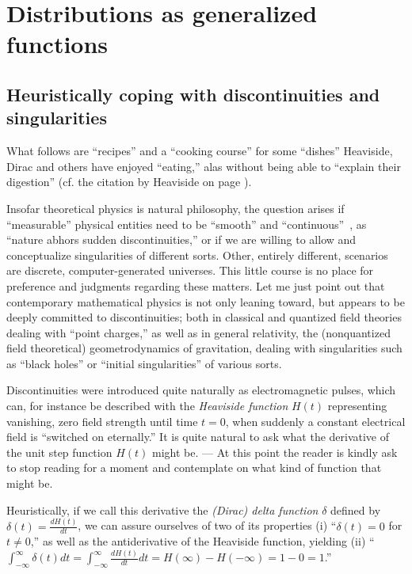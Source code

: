 \chapter{Distributions as generalized functions}
\label{2011-m-ch:gf}

\section{Heuristically coping with discontinuities and singularities}

What follows are ``recipes'' and a ``cooking course'' for some ``dishes'' Heaviside, Dirac and others
have enjoyed ``eating,'' alas without being able to ``explain their digestion''
(cf. the citation by Heaviside on page \pageref{2013-m-ch-intro-cooking}).

Insofar theoretical physics is natural philosophy,
the question arises if ``measurable'' physical entities need to be ``smooth'' and ``continuous''~\cite{trench},
as ``nature abhors sudden discontinuities,''
or if we are willing to allow and conceptualize singularities of different sorts.
Other, entirely different,
scenarios are discrete,
computer-generated universes.
This little course is no place for preference and judgments regarding these matters.
Let me just point out that contemporary mathematical physics is not only leaning toward,
but appears to be deeply committed to discontinuities;
both in classical and quantized field theories dealing with
 ``point charges,''
as well as in general relativity,  the (nonquantized field theoretical)
geometrodynamics of gravitation,
dealing with singularities such as ``black holes'' or ``initial singularities'' of various sorts.

Discontinuities were introduced quite naturally as electromagnetic pulses,
which can, for instance be described with the {\em Heaviside function}
$H(t)$ representing vanishing, zero field strength until time $t=0$, when suddenly a constant electrical field is
``switched on eternally.''
It is quite natural to ask what the derivative of the unit step function $H(t)$ might be.
---
At this point the reader is kindly ask to stop reading for a moment and contemplate
on what kind of function that might be.

Heuristically, if we call this derivative the {\em (Dirac) delta function} $\delta$ defined by
$\delta (t)= \frac{d H(t)}{dt}$,
we can assure ourselves of two of its properties
(i) ``$\delta (t) =0$ for $t\neq 0$,''
as well as the antiderivative of the Heaviside function, yielding
(ii) ``$\int_{-\infty}^\infty \delta (t) dt  = \int_{-\infty}^\infty \frac{d H(t)}{dt} dt  =
H(\infty ) - H(-\infty ) = 1-0=1$.''

